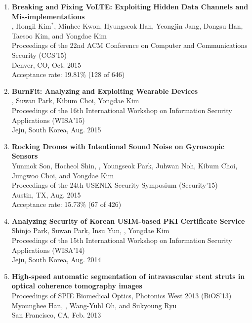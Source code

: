 \begin{enumerate}[leftmargin=1.5em]
    \item \textbf{Breaking and Fixing VoLTE: Exploiting Hidden Data Channels and Mis-implementations} \\
        {\small
            , Hongil Kim$^\ast$, Minhee Kwon, Hyungseok Han, Yeongjin Jang, Dongsu Han, Taesoo Kim, and Yongdae Kim \\
            Proceedings of the 22nd ACM Conference on Computer and Communications Security (CCS'15) \\
            Denver, CO, Oct. 2015 \\
            Acceptance rate: 19.81\% (128 of 646)
        }

    \item \textbf{BurnFit: Analyzing and Exploiting Wearable Devices} \\
        {\small
            , Suwan Park, Kibum Choi, Yongdae Kim \\
            Proceedings of the 16th International Workshop on Information Security Applications (WISA'15) \\
            Jeju, South Korea, Aug. 2015
        }

    \item \textbf{Rocking Drones with Intentional Sound Noise on Gyroscopic Sensors} \\
        {\small
            Yunmok Son, Hocheol Shin, , Youngseok Park, Juhwan Noh, Kibum Choi, Jungwoo Choi, and Yongdae Kim \\
            Proceedings of the 24th USENIX Security Symposium (Security'15) \\
            Austin, TX, Aug. 2015 \\
            Acceptance rate: 15.73\% (67 of 426)
        }

    \item \textbf{Analyzing Security of Korean USIM-based PKI Certificate Service} \\
        {\small
            Shinjo Park, Suwan Park, Insu Yun, , Yongdae Kim \\
            Proceedings of the 15th International Workshop on Information Security Applications (WISA'14) \\
            Jeju, South Korea, Aug. 2014
        }

    \item \textbf{High-speed automatic segmentation of intravascular stent struts in optical coherence tomography images} \\
        {\small
            Proceedings of SPIE Biomedical Optics, Photonics West 2013 (BiOS'13) \\
            Myounghee Han, , Wang-Yuhl Oh, and Sukyoung Ryu \\
            San Francisco, CA, Feb. 2013
        }
\end{enumerate}

